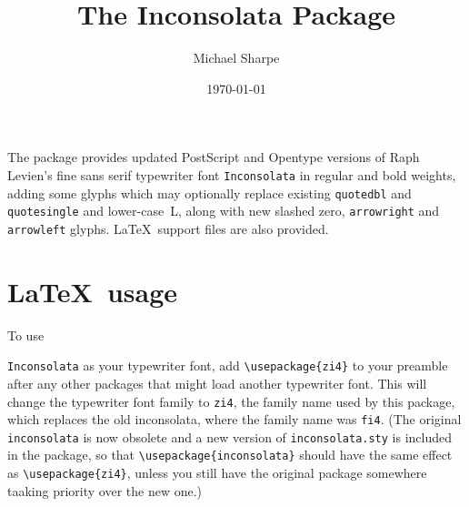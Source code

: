 \documentclass[11pt]{article}
\title{The Inconsolata  Package}
\author{Michael Sharpe}
\date{\today}  %
\begin{document}
\maketitle
The package provides updated PostScript and Opentype versions of Raph Levien's fine sans serif typewriter font
\texttt{Inconsolata} in regular and bold weights, adding some glyphs which may optionally replace existing \texttt{quotedbl} and \texttt{quotesingle} and lower-case~L, along with new slashed zero, \texttt{arrowright} and \texttt{arrowleft} glyphs. \LaTeX\ support files are also provided. 

\section*{\LaTeX\ usage}
To use {\texttt{Inconsolata} as your typewriter font, add \verb|\usepackage{zi4}| to your preamble after any other packages that might load another typewriter font. This
will change the typewriter font family to \texttt{zi4}, the family name used
by this package, which replaces the old \textsf{inconsolata}, where the family name was \texttt{fi4}.  (The original {\tt inconsolata} is now obsolete and a new version of {\tt inconsolata.sty} is included in the package, so that \verb|\usepackage{inconsolata}| should have the same effect as \verb|\usepackage{zi4}|, unless you still have the original package somewhere taaking priority over the new one.) 

}
\end{document}
